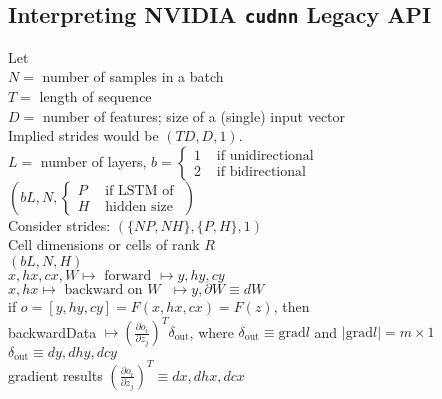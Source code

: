 \documentclass[10pt]{amsart}
\begin{document}
\begin{multicols*}{2}
\subsection{Interpreting NVIDIA \texttt{cudnn} Legacy API}

Let \\
$N = $ number of samples in a batch \\
$T = $ length of sequence \\
$D = $ number of features; size of a (single) input vector \\

Implied strides would be $(TD, D, 1)$. \\

$L=$ number of layers, $b= \begin{cases} 1 & \text{ if unidirectional } \\
	2 & \text{ if bidirectional } \end{cases}$ \\

$(bL, N, \begin{cases} P  & \text{ if LSTM of } \\ H & \text{ hidden size } \end{cases})$  \\

Consider strides: $( \lbrace NP, NH \rbrace, \lbrace P, H \rbrace, 1)$ \\

Cell dimensions or cells of rank $R$ \\
$(bL, N, H)$ \\

$x, hx, cx, W \mapsto \text{ forward } \mapsto y, hy, cy$ \\

$x,hx \mapsto \text{ backward on $W$ } \mapsto y, \partial W \equiv dW$ \\

if $o = [y, hy, cy] = F(x,hx, cx) = F(z)$, then \\

backwardData $\mapsto \left( \frac{ \partial o_i}{ \partial z_j } \right)^T \delta_{\text{out}}$, where $\delta_{\text{out}} \equiv \text{grad} l$ and $|\text{grad}l | = m\times 1$ \\

$\delta_{\text{out}} \equiv dy, dhy, dcy$ \\

gradient results $\left( \frac{ \partial o_i }{ \partial z_j} \right)^T \equiv dx, dhx, dcx$ \\


\end{multicols*}
\end{document}
